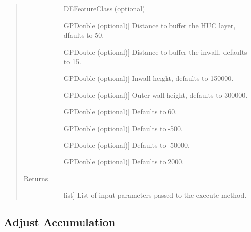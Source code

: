\documentclass[letterpaper,10pt,english]{sphinxmanual}
\begin{document}
\begin{fulllineitems}
\begin{fulllineitems}
\begin{quote}
\begin{description}
\begin{description}
\item[{}] \leavevmode{[}DEFeatureClass (optional){]}
\item[{}] \leavevmode{[}GPDouble (optional){]}
Distance to buffer the HUC layer, dfaults to 50.

\item[{}] \leavevmode{[}GPDouble (optional){]}
Distance to buffer the inwall, defaults to 15.

\item[{}] \leavevmode{[}GPDouble (optional){]}
Inwall height, defaults to 150000.

\item[{}] \leavevmode{[}GPDouble (optional){]}
Outer wall height, defaults to 300000.

\item[{}] \leavevmode{[}GPDouble (optional){]}
Defaults to 60.

\item[{}] \leavevmode{[}GPDouble (optional){]}
Defaults to -500.

\item[{}] \leavevmode{[}GPDouble (optional){]}
Defaults to -50000.

\item[{}] \leavevmode{[}GPDouble (optional){]}
Defaults to 2000.

\end{description}

\item[{Returns}] \leavevmode\begin{description}
\item[{}] \leavevmode{[}list{]}
List of input parameters passed to the execute method.

\end{description}

\end{description}\end{quote}

\end{fulllineitems}


\end{fulllineitems}



\subsection{Adjust Accumulation}
\label{\detokenize{StreamStats_DataPrep:adjust-accumulation}}
\end{document}
